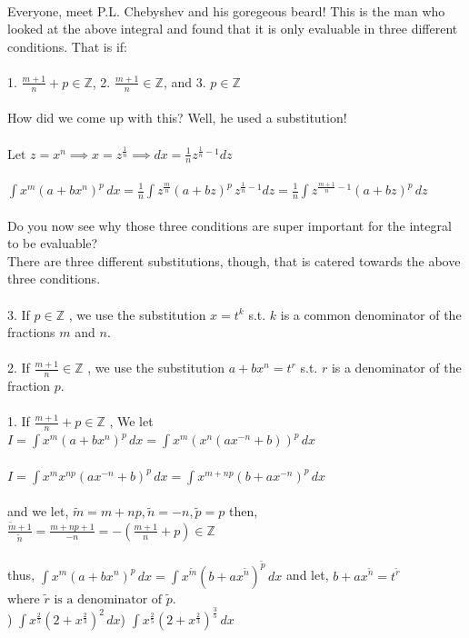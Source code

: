 \documentclass[11pt]{article}
\begin{document}
\\ {Everyone, meet P.L. Chebyshev and his goregeous beard! This is the man who looked at the above integral and found that it is only evaluable in three different conditions. That is if: }\\
\\ {1.} ${\frac{m+1}{n}+p \in \mathbb{Z}}${, 2. }${\frac{m+1}{n} \in \mathbb{Z}}${, and 3. }${p \in \mathbb{Z}}$\\
\\ {How did we come up with this? Well, he used a substitution!} \\
\\ ${\displaystyle \text{Let } z = x^{n} \implies x = z^{\frac{1}{n}} \implies dx = \frac{1}{n}z^{\frac{1}{n}-1} dz}$\\
\\ ${\displaystyle \int x^{m}(a+bx^{n})^{p} \,dx = \frac{1}{n}\int z^{\frac{m}{n}}(a+bz)^{p} \, z^{\frac{1}{n}-1}dz = \frac{1}{n}\int z^{\frac{m+1}{n}-1}(a+bz)^{p} \,dz}$ \\
\\ {Do you now see why those three conditions are super important for the integral to be evaluable?} \\
\newpage
{There are three different substitutions, though, that is catered towards the above three conditions.}\\
\\ {3. If } ${p \in \mathbb{Z}}$ {, we use the substitution } ${x = t^{k}}$ { s.t.} ${k}$ {is a common denominator of the fractions } ${m}$ { and } ${n.}$ \\
\\ {2. If } ${\frac{m+1}{n} \in \mathbb{Z}}$ {, we use the substitution } ${a + bx^{n} = t^{r}}$ { s.t.} ${r}$ {is a denominator of the fraction } ${p.}$ \\
\\ {1. If } ${\frac{m+1}{n}+p \in \mathbb{Z}}$ {, We let } ${\displaystyle I = \int x^{m}(a+bx^{n})^{p} \,dx = \int x^{m}(x^{n}(ax^{-n}+b))^{p} \,dx}$ \\
\\ ${\displaystyle I = \int x^{m}x^{np}(ax^{-n}+b)^{p} \,dx = \int x^{m+np}(b+ax^{-n})^{p} \,dx }$\\
\\ {and we let, } ${\tilde{m} = m+np, \tilde{n} = -n, \tilde{p} = p}$  { then, } ${\frac{\tilde{m} + 1}{\tilde{n}} = \frac{m+np+1}{-n} = -(\frac{m+1}{n} +p) \in \mathbb{Z}}$\\
\\ {thus, } ${\displaystyle \int x^{m}(a+bx^{n})^{p} \,dx = \int x^{\tilde{m}}(b+ax^{\tilde{n}})^{\tilde{p}}\,dx}$ { and let, } ${b+ax^{\tilde{n}} = t^{\tilde{r}}}$ ${\text{where } \tilde{r} \text{ is a denominator of } \tilde{p}.}$ \\
) ${\displaystyle \int x^{\frac{2}{5}}(2+x^{\frac{2}{3}})^{2} \,dx }$) ${\displaystyle \int x^{\frac{2}{5}}(2+x^{\frac{2}{3}})^{\frac{3}{5}} \,dx }$ \newpage
\end{document}
